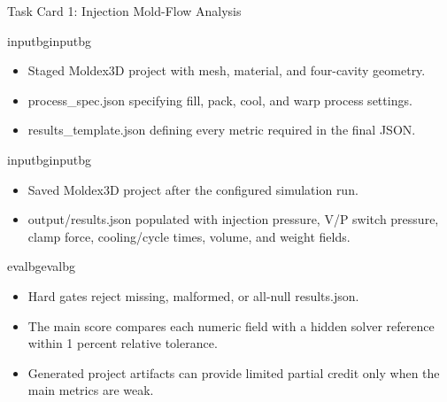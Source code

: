 \begin{ColorTaskCard}{Task Card 1: Injection Mold-Flow Analysis \hfill {}}
\begin{minipage}[t]{0.49\linewidth}
\vspace{0pt}
\begin{CardBlock}{inputbg}{inputbg}
\begin{itemize}
\item Staged Moldex3D project with mesh, material, and four-cavity geometry.
\item process\_spec.json specifying fill, pack, cool, and warp process settings.
\item results\_template.json defining every metric required in the final JSON.
\end{itemize}
\end{CardBlock}

\begin{CardBlock}{inputbg}{inputbg}
\begin{itemize}
\item Saved Moldex3D project after the configured simulation run.
\item output/results.json populated with injection pressure, V/P switch pressure, clamp force, cooling/cycle times, volume, and weight fields.
\end{itemize}
\end{CardBlock}

\end{minipage}\hfill
\begin{minipage}[t]{0.49\linewidth}
\vspace{0pt}
\begin{CardBlock}{evalbg}{evalbg}
\begin{itemize}
\item Hard gates reject missing, malformed, or all-null results.json.
\item The main score compares each numeric field with a hidden solver reference within 1 percent relative tolerance.
\item Generated project artifacts can provide limited partial credit only when the main metrics are weak.
\end{itemize}
\end{CardBlock}


\end{minipage}
\end{ColorTaskCard}
